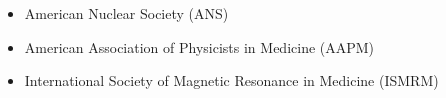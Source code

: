 
\begin{itemize}
\item American Nuclear Society (ANS)
\item American Association of Physicists in Medicine (AAPM)
\item International Society of Magnetic Resonance in Medicine (ISMRM)

\end{itemize}
